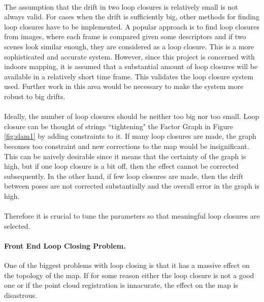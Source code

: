 \documentclass[11pt]{article}
\begin{document}
	\paragraph{}
	The assumption that the drift in two loop closures is relatively small is not always valid. For cases when the drift is sufficiently big, other methods for finding loop closures have to be implemented. A popular approach is to find loop closures from images, where each frame is compared given some descriptors and if two scenes look similar enough, they are considered as a loop closure. This is a more sophisticated and accurate system. However, since this project is concerned with indoors mapping, it is assumed that a substantial amount of loop closures will be available in a relatively short time frame. This validates the loop closure system used. Further work in this area would be necessary to make the system more robust to big drifts.	
	
	\paragraph{}
	Ideally, the number of loop closures should be neither too big nor too small. Loop closure can be thought of strings ``tightening" the Factor Graph in Figure \ref{fig:slam1} by adding constraints to it. If many loop closures are made, the graph becomes too constraint and new corrections to the map would be insignificant. This can be naively desirable since it means that the certainty of the graph is high, but if one loop closure is a bit off, then the effect cannot be corrected subsequently. In the other hand, if few loop closures are made, then the drift between poses are not corrected substantially and the overall error in the graph is high.
	
	\paragraph{}
	Therefore it is crucial to tune the parameters so that meaningful loop closures are selected. 

	\paragraph{Front End Loop Closing Problem.} One of the biggest problems with loop closing is that it has a massive effect on the topology of the map. If for some reason either the loop closure is not a good one or if the point cloud registration is innacurate, the effect on the map is disastrous.
	
\end{document}

